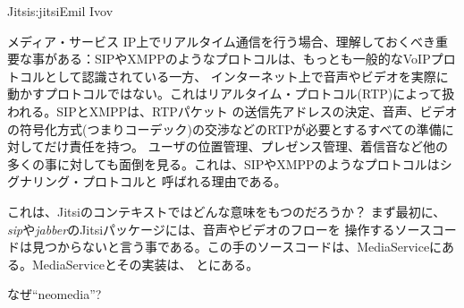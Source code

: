 \begin{aosachapter}{Jitsi}{s:jitsi}{Emil Ivov}
\begin{aosasect1}{メディア・サービス}
IP上でリアルタイム通信を行う場合、理解しておくべき重要な事がある：SIPやXMPPのようなプロトコルは、もっとも一般的なVoIPプロトコルとして認識されている一方、
インターネット上で音声やビデオを実際に動かすプロトコルではない。これはリアルタイム・プロトコル(RTP)によって扱われる。SIPとXMPPは、RTPパケット
の送信先アドレスの決定、音声、ビデオの符号化方式(つまりコーデック)の交渉などのRTPが必要とするすべての準備に対してだけ責任を持つ。
ユーザの位置管理、プレゼンス管理、着信音など他の多くの事に対しても面倒を見る。これは、SIPやXMPPのようなプロトコルはシグナリング・プロトコルと
呼ばれる理由である。

これは、Jitsiのコンテキストではどんな意味をもつのだろうか？ まず最初に、\emph{sip}や\emph{jabber}のJitsiパッケージには、音声やビデオのフローを
操作するソースコードは見つからないと言う事である。この手のソースコードは、MediaServiceにある。MediaServiceとその実装は、
とにある。

\begin{aosabox}{なぜ``neomedia''?}


\end{aosabox}
\end{aosasect1}
\end{aosachapter}
